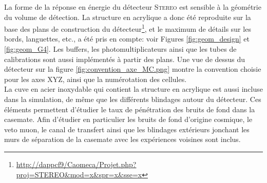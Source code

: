 La forme de la réponse en énergie du détecteur \textsc{Stereo} est sensible à la géométrie du volume de détection. La structure en acrylique a donc été reproduite sur la base des plans de construction du détecteur\footnote{\url{http://dappcf9/Caomeca/Projet.php?proj=STEREO&mod=x&spr=x&sse=x}}, et le maximum de détails sur les bords, languettes, etc., a été pris en compte: voir Figures \ref{fig:geom_design} et \ref{fig:geom_G4}. Les buffers, les photomultiplicateurs ainsi que les tubes de calibrations sont aussi implémentés à partir des plans. Une vue de dessus du détecteur sur la figure \ref{fig:convention_axe_MC.png} montre la convention choisie pour les axes XYZ, ainsi que la numérotation des cellules.\\

La cuve en acier inoxydable qui contient la structure en acrylique est aussi incluse dans la simulation, de même que les différents blindages autour du détecteur. Ces éléments permettent d'étudier le taux de pénétration des bruits de fond dans la casemate. Afin d'étudier en particulier les bruits de fond d'origine cosmique, le veto muon, le canal de transfert ainsi que les blindages extérieurs jonchant les murs de séparation de la casemate avec les expériences voisines sont inclus.\\

